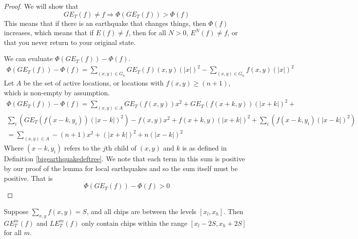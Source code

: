 \documentclass[runningheads,a4paper]{llncs}
\begin{document}
\begin{proof}
We will show that 
\begin{equation}
GE_T(f) \neq f \Rightarrow \Phi(GE_T(f)) > \Phi(f)
\end{equation}
This means that if there is an earthquake that changes things, then $\Phi(f)$ increases, which means that if $E(f) \neq f$, then for all $N > 0$, $E^N(f) \neq f$, or that you never return to your original state.

We can evaluate $\Phi(GE_T(f)) - \Phi(f)$.
\begin{align}
\Phi(GE_T(f))-\Phi(f) = \sum_{(x,y) \in G_n} GE_T(f)(x,y)(|x|)^2 - \sum_{(x,y) \in G_n} f(x,y)(|x|)^2 
\end{align}
Let $A$ be the set of active locations, or locations with $f(x,y) \geq (n+1)$, which is non-empty by assumption. 
\begin{align*}
\Phi(GE_T(f)) - \Phi(f) =  \sum_{(x,y) \in A}  GE_T(f(x,y))x^2 + GE_T(f(x+k,y))(|x+k|)^2 + \\
\sum_{i} \left( GE_T(f(x-k,y_i))(|x-k|)^2 \right) -f(x,y)x^2 +f(x+k,y) (|x+k|)^2 +  \sum_{i} \left ( f(x-k,y_i) (|x-k|)^2 \right)  \\
=\sum_{(x,y) \in A} -(n+1)x^2 + (|x+k|)^2 + n(|x-k|)^2 
\end{align*}
Where $(x-k,y_i)$ refers to the $j$th child of $(x,y)$ and $k$ is as defined in Definition \ref{bigearthquakedeftree}. We note that each term in this sum is positive by our proof of the lemma for local earthquakes and so the sum itself must be positive. That is 
\begin{equation}
\Phi(GE_T(f)) - \Phi(f) > 0
\end{equation}

\end{proof}

\begin{lemma}
\label{finiteextensiontree}
Suppose $\sum_{x,y} f(x,y) = S$, and all chips are between the levels $[x_l, x_h]$. Then $GE_T^m(f)$ and $LE_T^m(f)$ only contain chips within the range $[x_l - 2S, x_h + 2S]$ for all $m$.
\end{lemma}
\end{document}
